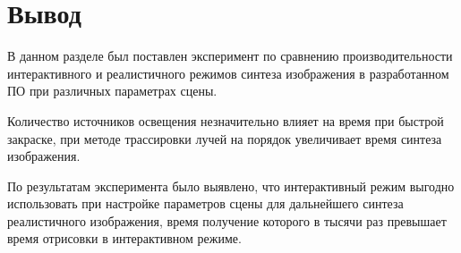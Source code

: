 \section{Вывод}

В данном разделе был поставлен эксперимент по сравнению производительности интерактивного и реалистичного режимов синтеза изображения в разработанном ПО при различных параметрах сцены.

Количество источников освещения незначительно влияет на время при быстрой закраске, при методе трассировки лучей на порядок увеличивает время синтеза изображения.

По результатам эксперимента было выявлено, что интерактивный режим выгодно использовать при настройке параметров сцены для дальнейшего синтеза реалистичного изображения, время получение которого в тысячи раз превышает время отрисовки в интерактивном режиме.
